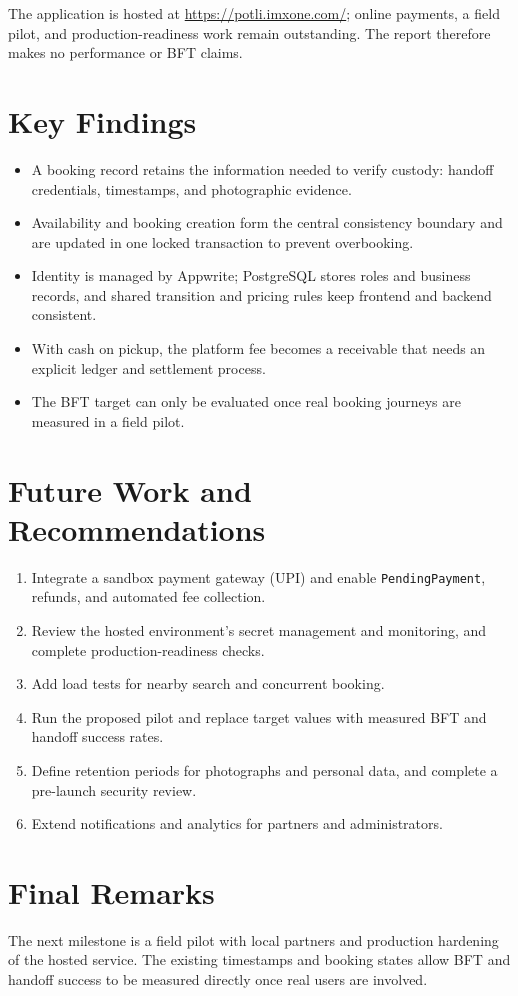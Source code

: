 \documentclass{tietreport}
\begin{document}
The application is hosted at \url{https://potli.imxone.com/}; online payments, a field pilot, and production-readiness work remain outstanding. The report therefore makes no performance or BFT claims.

\section{Key Findings}
\begin{itemize}[leftmargin=*]
  \item A booking record retains the information needed to verify custody: handoff credentials, timestamps, and photographic evidence.
  \item Availability and booking creation form the central consistency boundary and are updated in one locked transaction to prevent overbooking.
  \item Identity is managed by Appwrite; PostgreSQL stores roles and business records, and shared transition and pricing rules keep frontend and backend consistent.
  \item With cash on pickup, the platform fee becomes a receivable that needs an explicit ledger and settlement process.
  \item The BFT target can only be evaluated once real booking journeys are measured in a field pilot.
\end{itemize}

\section{Future Work and Recommendations}
\begin{enumerate}[leftmargin=*]
  \item Integrate a sandbox payment gateway (UPI) and enable \texttt{PendingPayment}, refunds, and automated fee collection.
  \item Review the hosted environment's secret management and monitoring, and complete production-readiness checks.
  \item Add load tests for nearby search and concurrent booking.
  \item Run the proposed pilot and replace target values with measured BFT and handoff success rates.
  \item Define retention periods for photographs and personal data, and complete a pre-launch security review.
  \item Extend notifications and analytics for partners and administrators.
\end{enumerate}

\section{Final Remarks}
The next milestone is a field pilot with local partners and production hardening of the hosted service. The existing timestamps and booking states allow BFT and handoff success to be measured directly once real users are involved.

\printbibliography[heading=bibintoc]
\end{document}

